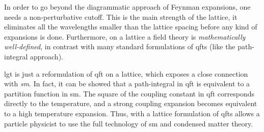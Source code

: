 In order to go beyond the diagrammatic approach of Feynman expansions, one needs a non-perturbative cutoff.
This is the main strength of the lattice, it eliminates all the wavelengths smaller than the lattice spacing before any kind of expansions is done.
Furthermore, on a lattice a field theory is \emph{mathematically well-defined}, in contrast with many standard formulations of \ac{qft}s (like the path-integral approach).

\Ac{lgt} is just a reformulation of \ac{qft} on a lattice, which exposes a close connection with \emph{\ac{sm}}.
In fact, it can be showed that a path-integral in \ac{qft} is equivalent to a partition function in \ac{sm}.
The square of the coupling constant in \ac{qft} corresponds directly to the temperature, and a strong coupling expansion becomes equivalent to a high temperature expansion.
Thus, with a lattice formulation of \ac{qft}s allows a particle physicist to use the full technology of \ac{sm} and condensed matter theory.

